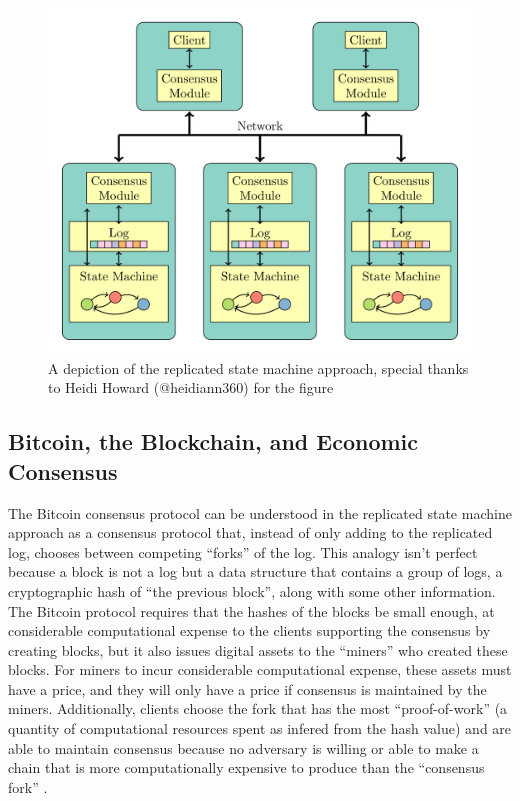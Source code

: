 \documentclass[11pt,a4paper]{article}
\theoremstyle{plain}
\theoremstyle{definition}
\begin{document}
\begin{figure}
\includegraphics{smr.png}
\caption{A depiction of the replicated state machine approach, special thanks to Heidi Howard (@heidiann360) for the figure}
\end{figure}


\subsection{Bitcoin, the Blockchain, and Economic Consensus}

The Bitcoin consensus protocol can be understood in the replicated state machine approach as a consensus protocol that, instead of only adding to the replicated log, chooses between competing ``forks'' of the log. 
This analogy isn't perfect because a block is not a log but a data structure that contains a group of logs, a cryptographic hash of ``the previous block'', along with some other information. The Bitcoin protocol requires that the hashes of the blocks be small enough, at considerable computational expense to the clients supporting the consensus by creating blocks, but it also issues digital assets to the ``miners'' who created these blocks. For miners to incur considerable computational expense, these assets must have a price, and they will only have a price if consensus is maintained by the miners. Additionally, clients choose the fork that has the most ``proof-of-work'' (a quantity of computational resources spent as infered from the hash value) and are able to maintain consensus because no adversary is willing or able to make a chain that is more computationally expensive to produce than the ``consensus fork'' \cite{Bitcoin}.
\end{document}
